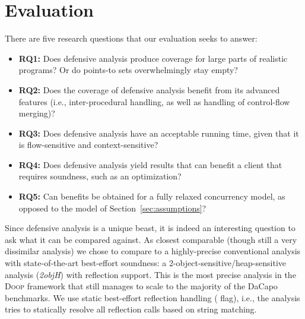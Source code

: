 \section{Evaluation}
\label{sec:experiments}

There are five research questions that our evaluation seeks to answer:
\begin{itemize}
\item \textbf{RQ1:} Does defensive analysis produce coverage for
  large parts of realistic programs? Or do points-to sets overwhelmingly stay
  empty?

\item \textbf{RQ2:} Does the coverage of defensive analysis benefit
  from its advanced features (i.e., inter-procedural handling, as well as
  handling of control-flow merging)? 

\item \textbf{RQ3:} Does defensive analysis have an acceptable running
  time, given that it is flow-sensitive and context-sensitive?

\item \textbf{RQ4:} Does defensive analysis yield results that can
  benefit a client that requires soundness, such as an optimization?

\item \textbf{RQ5:} Can benefits be obtained for a fully relaxed
  concurrency model, as opposed to the model of
  Section~\ref{sec:assumptions}?

\end{itemize}

  Since defensive analysis is a unique beast, it is indeed an
  interesting question to ask what it can be compared against. As
  closest comparable (though still a very dissimilar analysis) we
  chose to compare to a highly-precise conventional analysis with
  state-of-the-art best-effort soundness: a
  2-object-sensitive/heap-sensitive analysis (\emph{2objH}) with
  reflection support. This is the most precise analysis in the
  \textsc{Doop} framework that still manages to scale to the majority
  of the DaCapo benchmarks. We use static best-effort reflection
  handling ( flag), i.e., the analysis
  tries to statically resolve all reflection calls based on string
  matching.


  
